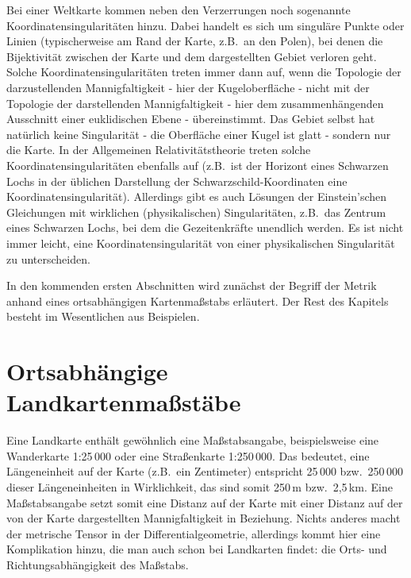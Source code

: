 Bei einer Weltkarte kommen neben den Verzerrungen noch sogenannte Koordinatensingularit\"aten
hinzu. 
Dabei handelt es sich um singul\"are Punkte oder Linien (typischerweise am Rand der
Karte, z.B.\ an den Polen), bei denen die Bijektivit\"at zwischen der Karte und dem dargestellten
Gebiet verloren geht. Solche Koordinatensingularit\"aten treten immer dann auf, wenn die
Topologie der darzustellenden Mannigfaltigkeit - hier der Kugeloberfl\"ache - nicht mit der 
Topologie der darstellenden Mannigfaltigkeit - hier dem zusammenh\"angenden Ausschnitt einer euklidischen
Ebene - \"ubereinstimmt. Das Gebiet selbst hat nat\"urlich keine Singularit\"at - die Oberfl\"ache einer
Kugel ist glatt - sondern nur die Karte. In der Allgemeinen Relativit\"atstheorie treten solche
Koordinatensingularit\"aten ebenfalls auf (z.B.\ ist der Horizont eines Schwarzen Lochs in der
\"ublichen Darstellung der Schwarzschild-Koordinaten eine Koordinatensingularit\"at). Allerdings
gibt es auch L\"osungen der Einstein'schen Gleichungen mit wirklichen (physikalischen) Singularit\"aten,
z.B.\ das Zentrum eines Schwarzen Lochs, bei dem die Gezeitenkr\"afte unendlich werden. Es ist
nicht immer leicht, eine Koordinatensingularit\"at von einer physikalischen Singularit\"at zu unterscheiden.

In den kommenden ersten Abschnitten wird zun\"achst der Begriff der Metrik anhand eines ortsabh\"angigen
Kartenma\ss stabs erl\"autert. Der Rest des Kapitels besteht im Wesentlichen aus Beispielen.

\section{Ortsabh\"angige Landkartenma\ss st\"abe}
\label{sec_ortsabhaengig}

Eine Landkarte enth\"alt 
gew\"ohnlich eine Ma\ss stabsangabe, beispielsweise eine
Wanderkarte 1:25\,000 oder eine Stra\ss enkarte 1:250\,000. Das bedeutet, eine
L\"angeneinheit auf der Karte (z.B.\ ein Zentimeter) entspricht 25\,000 bzw.\ 250\,000 dieser 
L\"angeneinheiten in Wirklichkeit, das sind somit 250\,m bzw.\ 2,5\,km.  
Eine Ma\ss stabsangabe setzt somit eine Distanz auf der Karte mit einer Distanz auf der
von der Karte dargestellten Mannigfaltigkeit in Beziehung. Nichts anderes macht der metrische
Tensor in der Differentialgeometrie, allerdings kommt hier eine Komplikation hinzu, die man
auch schon bei Landkarten findet: die Orts- und Richtungsabh\"angigkeit des Ma\ss stabs.

